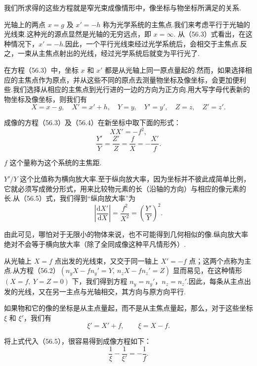 我们所求得的这些方程就是窄光束成像情形中，像坐标与物坐标所满足的关系.

光轴上的两点 $x=g$ 及 $x'=-h$ 称为光学系统的主焦点.我们来考虑平行于光轴的光线束.这种光的源点显然是光轴的无穷远点，即 $x=\infty$. 从（56.3）式看出，在这种情况下，$x'=-h$.因此，一个平行光线束经过光学系统后，会相交于主焦点.反之，一束从主焦点射出的光线，经过光学系统后就变为平行光了.

在方程（56.3）中，坐标 $x$ 和 $x'$ 都是从光轴上同一原点量起的.然而，如果选择相应的主焦点作为原点，并从这些不同的原点去测量物坐标及像坐标，会更加便利些.我们选择从相应的主焦点到光行进的一边的方向为正方向.用大写字母代表新的物坐标及像坐标，则我们有
\begin{equation*}
  X=x-g,\quad X'=x'+h,\quad Y=y,\quad Y'=y',\quad Z=z,\quad Z'=z'.
\end{equation*}

成像的方程（56.3）及（56.4）在新坐标中取下面的形式：
\begin{equation}
  XX'=-f^2,
\end{equation}
\begin{equation}
  \frac{Y'}{Y}=\frac{Z'}{Z}=\frac{f}{X}=-\frac{X'}{f}.
\end{equation}

$f$ 这个量称为这个系统的主焦距.

$Y'/Y$ 这个比值称为横向放大率.至于纵向放大率，因为坐标并不彼此成简单比例，它就必须写成微分形式，用来比较物元素的长（沿轴的方向）与相应的像元素的长.从（56.5）式，我们得到“纵向放大率”为
\begin{equation}
  \left|\frac{\mathrm{d}X'}{\mathrm{d}X}\right|
  =\frac{f^2}{X^2}=\left(\frac{Y'}{Y}\right)^2.
\end{equation}

由此可见，哪怕对于无限小的物体来说，也不可能得到几何相似的像.纵向放大率绝对不会等于横向放大率（除了全同成像这种平凡情形外）.

从光轴上 $X=f$ 点出发的光线束，又交于同一轴上 $X'=-f$ 点；这两个点称为主点.从方程（56.2）$(n_yX-fn_y'=Y,\ n_zX-fn_z'=Z)$ 显而易见，在这种情形 $(X=f,\ Y=Z=0)$ 下，我们得到方程 $n_y=n_y'$，$n_z=n_z'$.因此，每条从主点出发的光线，又在另一主点与光轴相交，其方向与原方向平行.

如果物和它的像的坐标是从主点量起，而不是从主焦点量起，那么，对于这些坐标 $\xi$ 和 $\xi'$，我们有
\begin{equation*}
  \xi'=X'+f,\qquad \xi=X-f.
\end{equation*}

将上式代入（56.5），很容易得到成像方程如下：
\begin{equation}
  \frac{1}{\xi}-\frac{1}{\xi'}=-\frac{1}{f}.
\end{equation}

